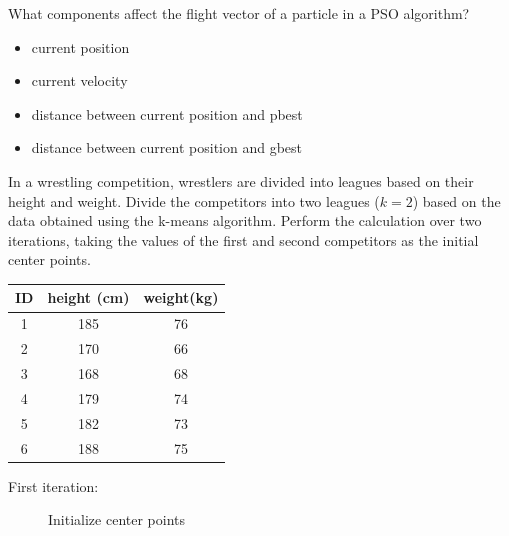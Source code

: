 \documentclass[a4paper,12pt,answers]{exam}
\begin{document}
\begin{questions}
	\question[15]
	What components affect the flight vector of a particle in a PSO algorithm?
	
	\begin{solution}
		\begin{itemize}
			\item current position
			\item current velocity
			\item distance between current position and pbest
			\item distance between current position and gbest
		\end{itemize}
	\end{solution}
	
	\newpage
	\question[30]
	In a wrestling competition, wrestlers are divided into leagues based on their height and weight. Divide the competitors into two leagues ($k=2$) based on the data obtained using the k-means algorithm. Perform the calculation over two iterations, taking the values of the first and second competitors as the initial center points.
	
	\begin{table}[H]
		\centering
		\begin{tabular}{|c|c|c|}
			\hline
			ID & height (cm) & weight(kg) \\ \hline \hline
			1 & 185 & 76 \\ \hline
			2 & 170 & 66 \\ \hline
			3 & 168 & 68 \\ \hline
			4 & 179 & 74 \\ \hline
			5 & 182 & 73 \\ \hline
			6 & 188 & 75 \\ \hline
		\end{tabular}
	\end{table}

	
	\begin{solution}
		First iteration:	
		\begin{figure}[H]
			\centering
			\caption{Initialize center points}
		\end{figure}
		

\end{solution}
\end{questions}
\end{document}
